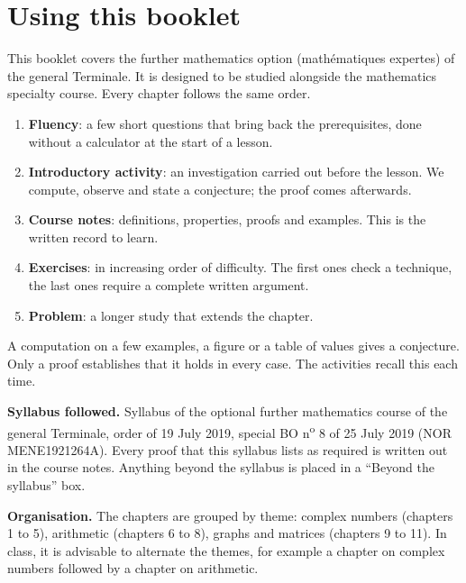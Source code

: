 \frontmatter
\chapter*{Using this booklet}
This booklet covers the further mathematics option (mathématiques expertes) of the general Terminale. It is designed to be studied alongside the mathematics specialty course. Every chapter follows the same order.
\begin{enumerate}
\item \textbf{Fluency}: a few short questions that bring back the prerequisites, done without a calculator at the start of a lesson.
\item \textbf{Introductory activity}: an investigation carried out before the lesson. We compute, observe and state a conjecture; the proof comes afterwards.
\item \textbf{Course notes}: definitions, properties, proofs and examples. This is the written record to learn.
\item \textbf{Exercises}: in increasing order of difficulty. The first ones check a technique, the last ones require a complete written argument.
\item \textbf{Problem}: a longer study that extends the chapter.
\end{enumerate}
\begin{keypoint}
A computation on a few examples, a figure or a table of values gives a conjecture. Only a proof establishes that it holds in every case. The activities recall this each time.
\end{keypoint}
\textbf{Syllabus followed.} Syllabus of the optional further mathematics course of the general Terminale, order of 19 July 2019, special BO n\textsuperscript{o} 8 of 25 July 2019 (NOR MENE1921264A). Every proof that this syllabus lists as required is written out in the course notes. Anything beyond the syllabus is placed in a ``Beyond the syllabus'' box.

\textbf{Organisation.} The chapters are grouped by theme: complex numbers (chapters 1 to 5), arithmetic (chapters 6 to 8), graphs and matrices (chapters 9 to 11). In class, it is advisable to alternate the themes, for example a chapter on complex numbers followed by a chapter on arithmetic.
\ifmxteacher
\mxnewpage
